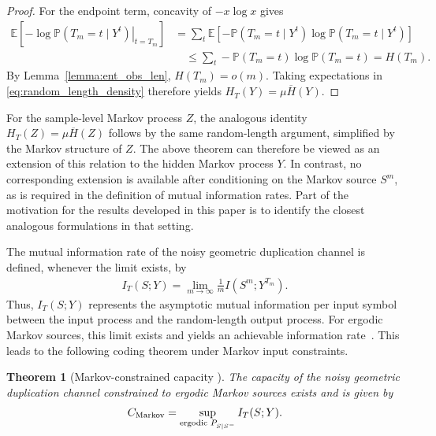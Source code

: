 \documentclass[onecolumn]{IEEEtran}
\newtheorem{theorem}{Theorem}
\theoremstyle{definition}
\begin{document}
\begin{proof}
{For the endpoint term, concavity of $-x\log x$ gives
\begin{align*}
\mathbb E\!\left[
-\left.\log \mathbb{P}(T_m=t\mid Y^t)\right|_{t=T_m}
\right]&=
\sum_t\mathbb E\!\left[
-\mathbb{P}(T_m=t\mid Y^t)
\log \mathbb{P}(T_m=t\mid Y^t)
\right]\\
&\quad\le
\sum_t
-\mathbb{P}(T_m=t)\log \mathbb{P}(T_m=t)
=H(T_m).
\end{align*}
By Lemma~\ref{lemma:ent_obs_len}, $H(T_m)=o(m)$. Taking expectations in
\eqref{eq:random_length_density} therefore yields $H_T(Y)=\mu\overline H(Y)$.}
\end{proof}


For the sample-level Markov process \(Z\), the analogous identity \(H_T(Z)=\mu\overline{H}(Z)\) follows by the same random-length argument,
simplified by the Markov structure of \(Z\). The above theorem can therefore be viewed as an extension of this relation to the hidden Markov process \(Y\). In contrast, no corresponding extension is available after conditioning on the Markov source \(S^m\), as is required in the definition of mutual information rates. Part of the motivation for the results developed in this paper is to identify the closest analogous formulations in that setting.

The mutual information rate of the noisy geometric duplication channel is defined, whenever the limit exists, by
\begin{align}
     I_T(S;Y) = \lim_{m\to\infty} \frac{1}{m} I(S^m;Y^{T_m}).
\end{align}
Thus, \(I_T(S;Y)\) represents the asymptotic mutual information per input symbol between the input process and the random-length output process. For ergodic Markov sources, this limit exists and yields an achievable information rate~\cite{McBain2024b}. This leads to the following coding theorem under Markov input constraints.

\begin{theorem}[Markov-constrained capacity {\cite[Theorem 4]{McBain2024b}}]\label{theorem:capacity}
The capacity of the noisy geometric duplication channel constrained to ergodic Markov sources exists and is given by
\begin{align}
    C_{\rm Markov}
    = \sup_{\text{ergodic }P_{S|S^-}} I_T(S;Y).
\end{align}
\end{theorem}
\end{document}
